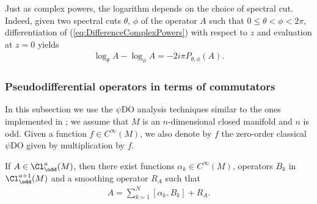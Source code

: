 Just as complex powers, the logarithm depends on the choice of spectral cut. Indeed, given two spectral cuts $\theta,\, \phi$ of the operator $A$ such that $0\leq \theta <\phi <2\pi$, dif\/ferentiation of (\ref{eq:DifferenceComplexPowers}) with respect to $z$ and evaluation at $z=0$ yields
\begin{gather}
\log_\theta A-\log_\phi A=-2i\pi P_{\theta, \phi}(A). \label{eq:difflogarithms}
\end{gather}

\subsubsection{Pseudodif\/ferential operators in terms of commutators}

In this subsection we use the $\psi$DO analysis techniques similar to the ones implemented in \cite{maniccia}; we assume that $M$ is an $n$-dimensional closed manifold and $n$ is odd. Given a function $f\in C^\infty(M)$, we also denote by $f$ the zero-order classical $\psi$DO given by multiplication by $f$.
\begin{proposition}\label{prop:PDOsumComutators}
If $A\in\Cl^{a}_{\odd}(M)$, then there exist functions $\alpha_k\in C^\infty(M)$, operators $B_k$ in $\Cl^{a+1}_{\odd}(M)$ and a smoothing operator $R_A$ such that
\begin{gather}
A=\sum_{k=1}^N[\alpha_k,B_k]+R_A. \label{eq:PDOsumComutators}
\end{gather}
\end{proposition}


